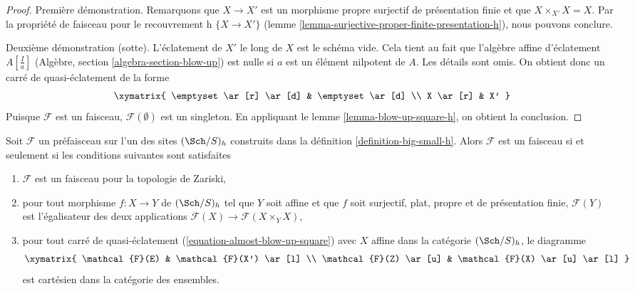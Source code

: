 \begin{proof}
Première démonstration. Remarquons que $X \to X'$ est un morphisme propre surjectif
de présentation finie et que $X \times_{X'} X = X$.
Par la propriété de faisceau pour le recouvrement h $\{X \to X'\}$
(lemme \ref{lemma-surjective-proper-finite-presentation-h}),
nous pouvons conclure.

\medskip\noindent
Deuxième démonstration (sotte). L'éclatement de $X'$ le long de $X$ est le schéma vide.
Cela tient au fait que l'algèbre affine d'éclatement $A[\frac{I}{a}]$
(Algèbre, section \ref{algebra-section-blow-up})
est nulle si $a$ est un élément nilpotent de $A$. Les détails sont omis.
On obtient donc un carré de quasi-éclatement de la forme
$$
\xymatrix{
\emptyset \ar[r] \ar[d] & \emptyset \ar[d] \\
X \ar[r] & X'
}
$$
Puisque $\mathcal{F}$ est un faisceau, $\mathcal{F}(\emptyset)$
est un singleton.
En appliquant le lemme \ref{lemma-blow-up-square-h}, on obtient la conclusion.
\end{proof}

\begin{proposition}
\label{proposition-check-h}
Soit $\mathcal{F}$ un préfaisceau sur l'un des sites $(\Sch/S)_h$
construits dans la définition \ref{definition-big-small-h}.
Alors $\mathcal{F}$ est un faisceau si et seulement si les
conditions suivantes sont satisfaites
\begin{enumerate}
\item $\mathcal{F}$ est un faisceau pour la topologie de Zariski,
\item pour tout morphisme $f : X \to Y$ de $(\Sch/S)_h$ tel que $Y$ soit affine
et que $f$ soit surjectif, plat, propre et de présentation finie,
$\mathcal{F}(Y)$ est l'égalisateur des deux applications
$\mathcal{F}(X) \to \mathcal{F}(X \times_Y X)$,
\item pour tout carré de quasi-éclatement (\ref{equation-almost-blow-up-square})
avec $X$ affine dans la catégorie $(\Sch/S)_h$, le diagramme
$$
\xymatrix{
\mathcal{F}(E) & \mathcal{F}(X') \ar[l] \\
\mathcal{F}(Z) \ar[u] & \mathcal{F}(X) \ar[u] \ar[l]
}
$$
est cartésien dans la catégorie des ensembles.
\end{enumerate}
\end{proposition}

